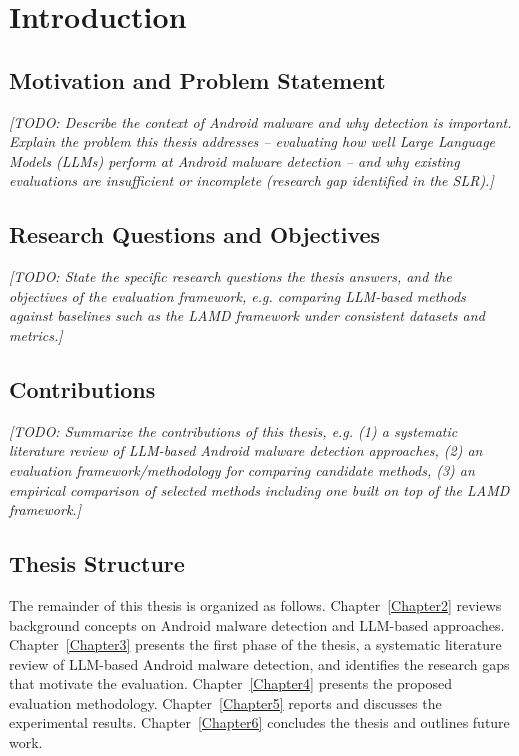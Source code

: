 \chapter{Introduction}
\label{Chapter1}

\section{Motivation and Problem Statement}

\textit{[TODO: Describe the context of Android malware and why detection is
important. Explain the problem this thesis addresses -- evaluating how well
Large Language Models (LLMs) perform at Android malware detection -- and why
existing evaluations are insufficient or incomplete (research gap identified
in the SLR).]}

\section{Research Questions and Objectives}

\textit{[TODO: State the specific research questions the thesis answers, and
the objectives of the evaluation framework, e.g. comparing LLM-based methods
against baselines such as the LAMD framework under consistent datasets and
metrics.]}

\section{Contributions}

\textit{[TODO: Summarize the contributions of this thesis, e.g. (1) a
systematic literature review of LLM-based Android malware detection
approaches, (2) an evaluation framework/methodology for comparing candidate
methods, (3) an empirical comparison of selected methods including one built
on top of the LAMD framework.]}

\section{Thesis Structure}

The remainder of this thesis is organized as follows.
Chapter~\ref{Chapter2} reviews background concepts on Android malware
detection and LLM-based approaches.
Chapter~\ref{Chapter3} presents the first phase of the thesis, a systematic
literature review of LLM-based Android malware detection, and identifies the
research gaps that motivate the evaluation.
Chapter~\ref{Chapter4} presents the proposed evaluation methodology.
Chapter~\ref{Chapter5} reports and discusses the experimental results.
Chapter~\ref{Chapter6} concludes the thesis and outlines future work.
